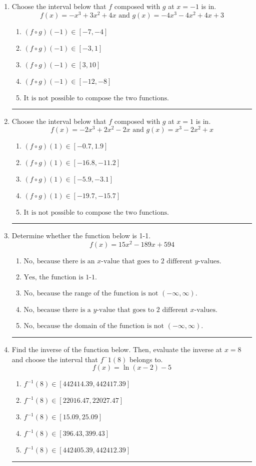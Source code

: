 \documentclass[14pt]{extbook}
\newcommand{\litem}[1]{\item#1\hspace*{-1cm}\rule{\textwidth}{0.4pt}}
\begin{document}
\begin{enumerate}
{\begin{enumerate}[label=\Alph*.]
\end{enumerate} }
\litem{
Choose the interval below that $f$ composed with $g$ at $x=-1$ is in.\[ f(x) = -x^{3} +3 x^{2} +4 x \text{ and } g(x) = -4x^{3} -4 x^{2} +4 x + 3 \]\begin{enumerate}[label=\Alph*.]
\item \( (f \circ g)(-1) \in [-7, -4] \)
\item \( (f \circ g)(-1) \in [-3, 1] \)
\item \( (f \circ g)(-1) \in [3, 10] \)
\item \( (f \circ g)(-1) \in [-12, -8] \)
\item \( \text{It is not possible to compose the two functions.} \)

\end{enumerate} }
\litem{
Choose the interval below that $f$ composed with $g$ at $x=1$ is in.\[ f(x) = -2x^{3} +2 x^{2} -2 x \text{ and } g(x) = x^{3} -2 x^{2} +x \]\begin{enumerate}[label=\Alph*.]
\item \( (f \circ g)(1) \in [-0.7, 1.9] \)
\item \( (f \circ g)(1) \in [-16.8, -11.2] \)
\item \( (f \circ g)(1) \in [-5.9, -3.1] \)
\item \( (f \circ g)(1) \in [-19.7, -15.7] \)
\item \( \text{It is not possible to compose the two functions.} \)

\end{enumerate} }
\litem{
Determine whether the function below is 1-1.\[ f(x) = 15 x^2 - 189 x + 594 \]\begin{enumerate}[label=\Alph*.]
\item \( \text{No, because there is an $x$-value that goes to 2 different $y$-values.} \)
\item \( \text{Yes, the function is 1-1.} \)
\item \( \text{No, because the range of the function is not $(-\infty, \infty)$.} \)
\item \( \text{No, because there is a $y$-value that goes to 2 different $x$-values.} \)
\item \( \text{No, because the domain of the function is not $(-\infty, \infty)$.} \)

\end{enumerate} }
\litem{
Find the inverse of the function below. Then, evaluate the inverse at $x = 8$ and choose the interval that $f^-1(8)$ belongs to.\[ f(x) = \ln{(x-2)}-5 \]\begin{enumerate}[label=\Alph*.]
\item \( f^{-1}(8) \in [442414.39, 442417.39] \)
\item \( f^{-1}(8) \in [22016.47, 22027.47] \)
\item \( f^{-1}(8) \in [15.09, 25.09] \)
\item \( f^{-1}(8) \in [396.43, 399.43] \)
\item \( f^{-1}(8) \in [442405.39, 442412.39] \)


\end{enumerate}}
\end{enumerate}
\end{document}
